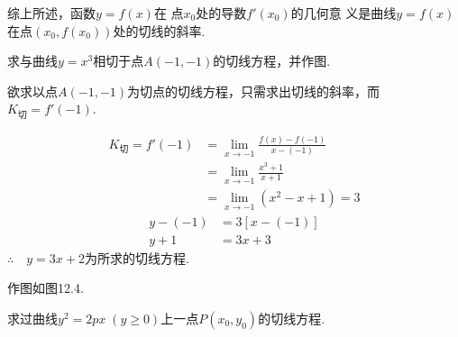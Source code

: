 综上所述，函数$y=f(x)$在
点$x_0$处的导数$f'(x_0)$的几何意
义是曲线$y=f(x)$在点$(x_0,f(x_0))$处的切线的斜率.

\begin{example}
求与曲线$y=x^3$相切于点$A(-1,-1)$的切线方程，并作图.
\end{example}

\noindent
\begin{minipage}{.55\textwidth}
    \begin{analyze}
        欲求以点$A(-1,-1)$为切点的切线方程，只需求出切线的斜率，而$K_{\text{切}}=f'(-1)$.
    \end{analyze}
    
    \begin{solution}
\[\begin{split}
    K_{\text{切}}=f'(-1)&=\lim_{x\to -1}\frac{f(x)-f(-1)}{x-(-1)}\\
    &=\lim_{x\to -1}\frac{x^3+1}{x+1}\\
    &=\lim_{x\to -1}(x^2-x+1)=3
\end{split}\]
\[\begin{split}
    y-(-1)&=3[x-(-1)]\\
    y+1&=3x+3
\end{split}\]
$\therefore\quad y=3x+2$为所求的切线方程. 

作图如图12.4.    
\end{solution}
\end{minipage}
\begin{minipage}{.4\textwidth}
\centering
{}
\end{minipage}
    
\begin{example}
求过曲线$y^2=2px\; (y\ge 0)$上一点$P(x_0,y_0)$的切线方程.
\end{example}


